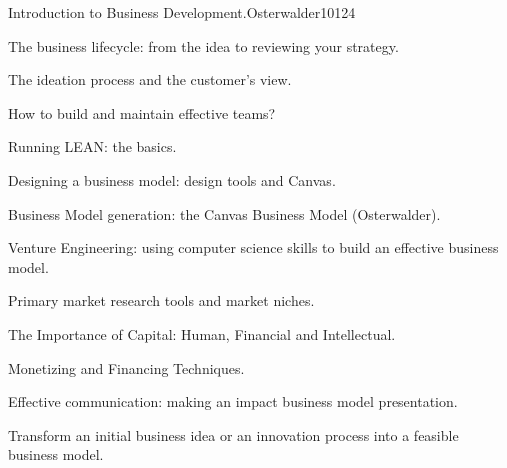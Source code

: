 \begin{syllabus}
\begin{unit}{Introduction to Business Development.}{}{Osterwalder10}{12}{4}
   \begin{topics}
      \item The business lifecycle: from the idea to reviewing your strategy.
      \item The ideation process and the customer’s view.
      \item How to build and maintain effective teams?
      \item Running LEAN: the basics.
      \item Designing a business model: design tools and Canvas.
      \item Business Model generation: the Canvas Business Model (Osterwalder).
      \item Venture Engineering: using computer science skills to build an effective business model.
      \item Primary market research tools and market niches.
      \item The Importance of Capital: Human, Financial and Intellectual.
      \item Monetizing and Financing Techniques.
      \item Effective communication: making an impact business model presentation.
   \end{topics}
   \begin{learningoutcomes}
      \item Transform an initial business idea or an innovation process into a feasible business model.
   \end{learningoutcomes}
\end{unit}

\begin{coursebibliography}
\end{coursebibliography}

\end{syllabus}
